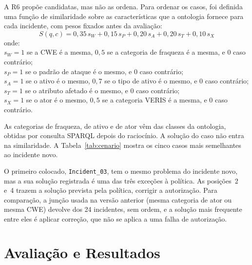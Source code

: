 \documentclass[12pt]{article}
\newcommand{\oc}[1]{\texttt{#1}}
\begin{document}
A R6 propõe candidatas, mas não as ordena. Para ordenar os casos, foi definida uma função de similaridade sobre as características que a ontologia fornece para cada incidente, com pesos fixados antes da avaliação:
\begin{equation}
S(q,c) = 0{,}35\,s_{W} + 0{,}15\,s_{P} + 0{,}20\,s_{A} + 0{,}20\,s_{T} + 0{,}10\,s_{X}
\end{equation}
onde:\\
\hspace*{1.2em}$s_W = 1$ se a CWE é a mesma, $0{,}5$ se a categoria de fraqueza é a mesma, e 0 caso contrário;\\
\hspace*{1.2em}$s_P = 1$ se o padrão de ataque é o mesmo, e 0 caso contrário;\\
\hspace*{1.2em}$s_A = 1$ se o ativo é o mesmo, $0{,}7$ se o tipo de ativo é o mesmo, e 0 caso contrário;\\
\hspace*{1.2em}$s_T = 1$ se o atributo afetado é o mesmo, e 0 caso contrário;\\
\hspace*{1.2em}$s_X = 1$ se o ator é o mesmo, $0{,}5$ se a categoria VERIS é a mesma, e 0 caso contrário.

As categorias de fraqueza, de ativo e de ator vêm das classes da ontologia, obtidas por consulta SPARQL depois do raciocínio. A solução do caso não entra na similaridade. A Tabela~\ref{tab:cenario} mostra os cinco casos mais semelhantes ao incidente novo.

\begin{table}[ht]
\centering\small
\caption{Cinco casos mais semelhantes ao incidente novo (gerada a partir da evidência).}
\label{tab:cenario}

\end{table}

O primeiro colocado, \oc{Incident\_03}, tem o mesmo problema do incidente novo, mas a sua solução registrada é uma das três exceções à política. As posições~2 e~4 trazem a solução prevista pela política, corrigir a autorização. Para comparação, a junção usada na versão anterior (mesma categoria de ator ou mesma CWE) devolve \scenVsixN{} dos 24 incidentes, sem ordem, e a solução mais frequente entre eles é aplicar correção, que não se aplica a uma falha de autorização.

\section{Avaliação e Resultados}
\label{sec:res}
\end{document}
